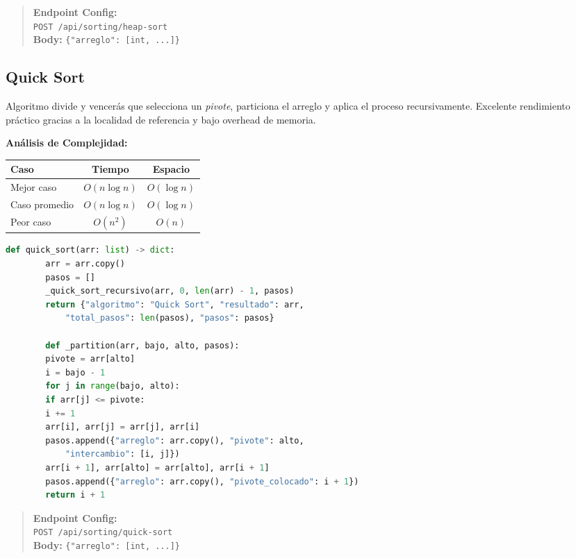 \documentclass[12pt, letterpaper]{article}
\begin{document}
	\begin{quote}
		\textbf{Endpoint Config:} \\
		\texttt{POST /api/sorting/heap-sort} \\
		\textbf{Body:} \texttt{\{"arreglo": [int, ...]\}}
	\end{quote}
	
	\subsection{Quick Sort}
	Algoritmo divide y vencerás que selecciona un \textit{pivote}, particiona el arreglo y aplica el proceso recursivamente. Excelente rendimiento práctico gracias a la localidad de referencia y bajo overhead de memoria.
	
	\textbf{Análisis de Complejidad:}
	\begin{table}[h]
		\centering
		\begin{tabular}{@{}lcc@{}}
			\toprule
			\textbf{Caso} & \textbf{Tiempo} & \textbf{Espacio} \\ \midrule
			Mejor caso    & $O(n \log n)$   & $O(\log n)$ \\
			Caso promedio & $O(n \log n)$   & $O(\log n)$ \\
			Peor caso     & $O(n^2)$        & $O(n)$ \\ \bottomrule
		\end{tabular}
	\end{table}
	
	\begin{lstlisting}[language=Python, caption={Implementacion de Quick Sort}]
		def quick_sort(arr: list) -> dict:
		arr = arr.copy()
		pasos = []
		_quick_sort_recursivo(arr, 0, len(arr) - 1, pasos)
		return {"algoritmo": "Quick Sort", "resultado": arr,
			"total_pasos": len(pasos), "pasos": pasos}
		
		def _partition(arr, bajo, alto, pasos):
		pivote = arr[alto]
		i = bajo - 1
		for j in range(bajo, alto):
		if arr[j] <= pivote:
		i += 1
		arr[i], arr[j] = arr[j], arr[i]
		pasos.append({"arreglo": arr.copy(), "pivote": alto,
			"intercambio": [i, j]})
		arr[i + 1], arr[alto] = arr[alto], arr[i + 1]
		pasos.append({"arreglo": arr.copy(), "pivote_colocado": i + 1})
		return i + 1
	\end{lstlisting}
	
	\begin{quote}
		\textbf{Endpoint Config:} \\
		\texttt{POST /api/sorting/quick-sort} \\
		\textbf{Body:} \texttt{\{"arreglo": [int, ...]\}}
	\end{quote}
	
\end{document}
